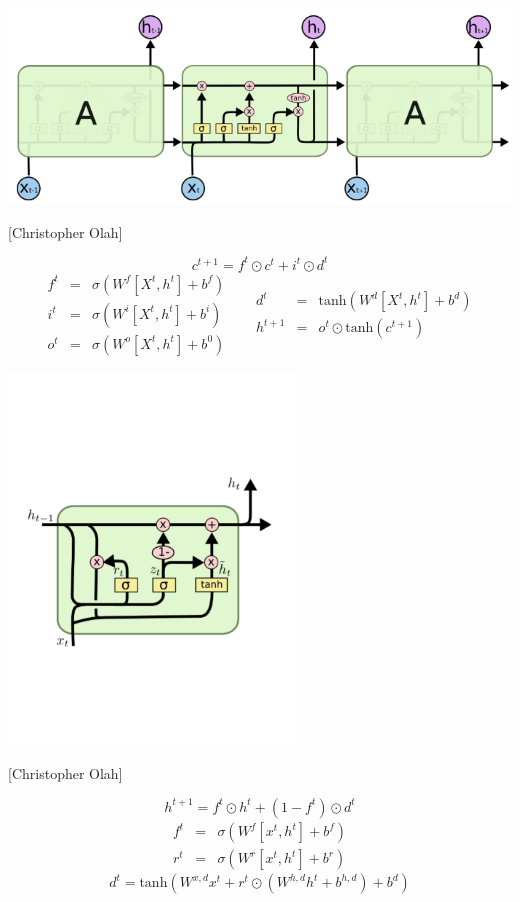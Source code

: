 {\centerline{\includegraphics[width=6.0in]{../images/LSTM}}
\centerline{{\large [Christopher Olah]}}
$$c^{t+1} = f^t\odot c^t + i^t \odot d^t$$
\bigskip
$$\begin{array}{rcl}
  f^t & = & \sigma(W^f[X^t,h^t] + b^f) \\ i^t & = & \sigma(W^i[X^t,h^t]+ b^i) \\o^t & = & \sigma(W^o[X^t,h^t]+ b^0)
\end{array}
\;\;\;\;\;
\begin{array}{rcl}
d^t & = & \mathrm{tanh}(W^d[X^t,h^t] + b^d) \\ h^{t+1} & = & o^t \odot \mathrm{tanh}(c^{t+1})
\end{array}$$


\centerline{\includegraphics[width=3.0in]{../images/GRU}}
\centerline{{\huge [Christopher Olah]}}
\bigskip
$$h^{t+1} = f^t\odot h^t + (1-f^t)\odot d^t$$
\begin{eqnarray*}
  f^t & = & \sigma(W^f[x^t,h^t] + b^f) \\
  r^t & = & \sigma(W^r[x^t,h^t] + b^r)
\end{eqnarray*}
$$d^t =  \mathrm{tanh}(W^{x,d}x^t + r^t \odot (W^{h,d}h^t + b^{h,d}) + b^d)$$

}
